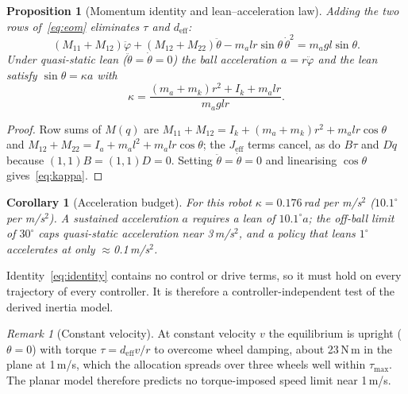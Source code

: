 \documentclass[conference]{IEEEtran}
\newtheorem{proposition}{Proposition}
\newtheorem{corollary}{Corollary}
\theoremstyle{remark}
\newtheorem{remark}{Remark}
\begin{document}
\begin{proposition}[Momentum identity and lean--acceleration law]\label{prop:lean}
Adding the two rows of~\eqref{eq:eom} eliminates $\tau$ and $d_{\mathrm{eff}}$:
\begin{equation}
(M_{11}+M_{12})\ddot\varphi+(M_{12}+M_{22})\ddot\theta-m_alr\sin\theta\,\dot\theta^2=m_agl\sin\theta.\label{eq:identity}
\end{equation}
Under quasi-static lean ($\ddot\theta=\dot\theta=0$) the ball acceleration $a=r\ddot\varphi$ and the lean satisfy $\sin\theta=\kappa a$ with
\begin{equation}
\kappa=\frac{(m_a+m_k)r^2+I_k+m_alr}{m_a g l r}.\label{eq:kappa}
\end{equation}
\end{proposition}
\begin{proof}
Row sums of $M(q)$ are $M_{11}+M_{12}=I_k+(m_a+m_k)r^2+m_alr\cos\theta$ and $M_{12}+M_{22}=I_a+m_al^2+m_alr\cos\theta$; the $J_{\mathrm{eff}}$ terms cancel, as do $B\tau$ and $D\dot q$ because $(1,1)B=(1,1)D=0$. Setting $\ddot\theta=\dot\theta=0$ and linearising $\cos\theta$ gives~\eqref{eq:kappa}.
\end{proof}
\begin{corollary}[Acceleration budget]
For this robot $\kappa=0.176$\,rad per m/s$^2$ ($10.1^\circ$ per m/s$^2$). A sustained acceleration $a$ requires a lean of $10.1^\circ a$; the off-ball limit of $30^\circ$ caps quasi-static acceleration near 3\,m/s$^2$, and a policy that leans $1^\circ$ accelerates at only $\approx$0.1\,m/s$^2$.
\end{corollary}
Identity~\eqref{eq:identity} contains no control or drive terms, so it must hold on every trajectory of every controller. It is therefore a controller-independent test of the derived inertia model.

\begin{remark}[Constant velocity]
At constant velocity $v$ the equilibrium is upright ($\theta=0$) with torque $\tau=d_{\mathrm{eff}}v/r$ to overcome wheel damping, about 23\,N\,m in the plane at 1\,m/s, which the allocation spreads over three wheels well within $\tau_{\max}$. The planar model therefore predicts no torque-imposed speed limit near 1\,m/s.
\end{remark}
\end{document}
